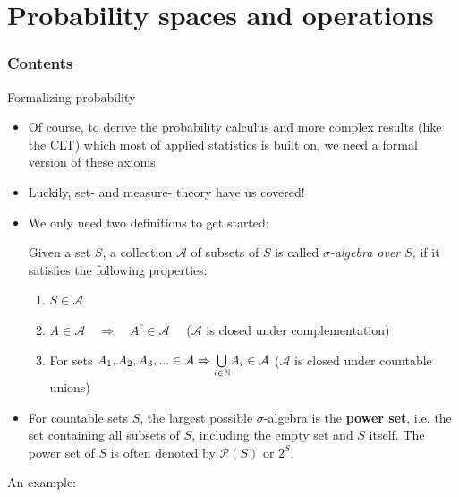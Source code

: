 \documentclass[a4,11pt]{beamer}
\newlength{\wideitemsep}
\let\olditem\item
\renewcommand{\item}{\setlength{\itemsep}{\wideitemsep}\olditem}
\begin{document}
\section{Probability spaces and operations}
  {
     \begin{frame}
     \frametitle{Contents}
     \tableofcontents[currentsection]
     \end{frame}
  }
\begin{frame}[allowframebreaks]{Formalizing probability}
        \begin{itemize}
        \item Of course, to derive the probability calculus and more complex results (like the CLT) which most of applied statistics is built on, we need a formal version of these axioms.
        \item Luckily, set- and measure- theory have us covered!
        \item We only need two definitions to get started:\pagebreak
        \begin{definition}
        Given a set $S$, a collection $\mathcal{A}$ of subsets of $S$ is called \emph{$\sigma$-algebra over $S$}, if it satisfies the following properties:\begin{enumerate}
            \item $S\in\mathcal{A}$\vspace{-.5cm}\\
            \item $A\in\mathcal{A}\quad\Rightarrow\quad A^c\in\mathcal{A}\quad$ ($\mathcal{A}$ is closed under complementation)\vspace{-.5cm}\\
            \item For sets $A_1,A_2,A_3,...\in\mathcal{A}\Rightarrow\underset{i\in\mathbb{N}}{\bigcup}A_i\in\mathcal{A}$ ($\mathcal{A}$  is closed under countable unions)
        \end{enumerate}
        \end{definition}
        \item For countable sets $S$, the largest possible $\sigma$-algebra is the \textbf{power set}, i.e. the set containing all subsets of $S$, including the empty set and $S$ itself. The power set of $S$ is often denoted by $\mathcal{P}(S)$ or $2^S$.
    \end{itemize}
    \pagebreak
    \begin{minipage}{.2\linewidth}
        An example:
    \end{minipage}%
    \begin{minipage}{.6\linewidth}

\end{minipage}
\end{frame}
\end{document}
